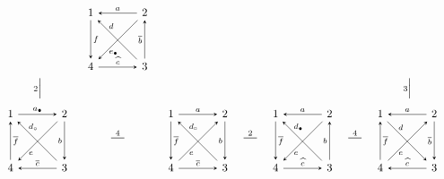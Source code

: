 \documentclass[11pt, letterpaper]{amsart}
\theoremstyle{definition}
\numberwithin{equation}{section}
\newcommand{\shortmutation}[1]{\stackrel{#1}{\rule[.5ex]{1.2em}{0.5pt}}}
\newcommand{\vmutation}[1]{  {\scriptstyle #1}{\Bigl|\Bigr.}  }
\def\ssquare{\scalebox{.75}{$\scriptscriptstyle\Box$}}
\begin{document}
\begin{figure}[ht]
\begin{equation*}
\begin{array}{ccccccccc}
&  

\begin{tikzcd}[arrows={-stealth}, sep=\sepps]
  1  \arrow[r,  "a", \snsl] \arrow[dr, "d" near start, outer sep=\outsepd, \snsl]  \arrow[d, "f", \snls]  
  & 2  \arrow[d, swap, "\overline{b}", \snsl] \arrow[dl, "e_\bullet", near end, outer sep=\outsepe, \snls]
  \\
   4 
   & 3  \arrow[l, "\widehat{c}", swap, \snsl] 
\end{tikzcd}

 & \\ 
\\[-8pt]
\vmutation{2}   & & & & & & \vmutation{3} \\[-6pt]
\\
\begin{tikzcd}[arrows={-stealth}, sep=\sepps]
  1  \arrow[r,  "a_\bullet", \snls] \arrow[dr, "d_\circ" near start, outer sep=\outsepd, \snsl]  \arrow[d, "\overline{f}", \snsl]  
  & 2  \arrow[d, swap, "b", \snls] \arrow[dl, "e", near end, outer sep=\outsepe, \snls]
  \\
   4 
   & 3  \arrow[l, "\overline{c}", swap, \snls] 
\end{tikzcd}

& \shortmutation {4}
& 
\begin{tikzcd}[arrows={-stealth}, sep=\sepps]
  1  \arrow[r,  "a", \snls] \arrow[dr, "d_{\ssquare}" near start, outer sep=\outsepd, \snsl]  \arrow[d, "\overline{f}", \snls]  
  & 2  \arrow[d, swap, "b", \snls] \arrow[dl, "e", near end, outer sep=\outsepe, \snsl]
  \\
   4 
   & 3  \arrow[l, "\overline{c}", swap, \snsl] 
\end{tikzcd}
& \shortmutation 2 
&  
\begin{tikzcd}[arrows={-stealth}, sep=\sepps]
  1  \arrow[r,  "a", \snsl] \arrow[dr, "d_\bullet" near start, outer sep=\outsepd, \snsl]  \arrow[d, "\overline{f}", \snls]  
  & 2  \arrow[d, swap, "b", \snsl] \arrow[dl, "e", near end, outer sep=\outsepe, \snls]
  \\
   4 
   & 3  \arrow[l, "\widehat{c}", swap, \snsl] 
\end{tikzcd}
& \shortmutation 4
&  

\begin{tikzcd}[arrows={-stealth}, sep=\sepps]
  1  \arrow[r,  "a", \snsl] \arrow[dr, "d" near start, outer sep=\outsepd, \snls]  \arrow[d, "\overline{f}", \snsl]  
  & 2  \arrow[d, swap, "\overline{b}", \snls] \arrow[dl, "e", near end, outer sep=\outsepe, \snsl]
  \\
   4 
   & 3  \arrow[l, "\widehat{c}", swap, \snls] 
\end{tikzcd}


\end{array}
\end{equation*}
\end{figure}
\end{document}
